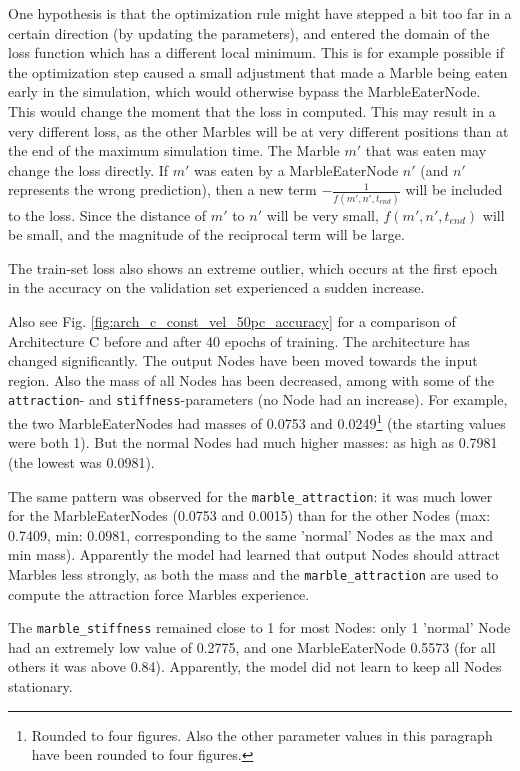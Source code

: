 One hypothesis is that the optimization rule might have stepped a bit too far in a certain direction (by updating the parameters), 
and entered the domain of the loss function which has a different local minimum. 
This is for example possible if the optimization step caused a small adjustment that made a Marble being eaten early in the simulation, 
which would otherwise bypass the MarbleEaterNode. This would change the moment that the loss in computed. 
This may result in a very different loss, as the other Marbles will be at very different positions than at the end of the maximum simulation time.
The Marble $m'$ that was eaten may change the loss directly. 
If $m'$ was eaten by a MarbleEaterNode $n'$ (and $n'$ represents the wrong prediction), 
then a new term $- \frac{1}{f(m', n', t_{end})}$ will be included to the loss. 
Since the distance of $m'$ to $n'$ will be very small, $f(m', n', t_{end})$ will be small,
and the magnitude of the reciprocal term will be large.

The train-set loss also shows an extreme outlier, which occurs at the first epoch in the accuracy on the validation set experienced a sudden increase. 

Also see Fig. \ref{fig:arch_c_const_vel_50pc_accuracy} for a comparison of Architecture C before and after 40 epochs of training. The architecture has changed significantly. The output Nodes have been moved towards the input region. Also the mass of all Nodes has been decreased, among with some of the \texttt{attraction}- and \texttt{stiffness}-parameters (no Node had an increase). For example, the two MarbleEaterNodes had masses of 0.0753 and 0.0249\footnote{Rounded to four figures. Also the other parameter values in this paragraph have been rounded to four figures.} (the starting values were both 1). But the normal Nodes had much higher masses: as high as 0.7981 (the lowest was 0.0981).

The same pattern was observed for the \texttt{marble\_attraction}: 
it was much lower for the MarbleEaterNodes (0.0753 and 0.0015) 
than for the other Nodes 
(max: 0.7409, min: 0.0981, corresponding to the same 'normal' Nodes as the max and min mass).
Apparently the model had learned that output Nodes should attract Marbles less strongly, 
as both the mass and the \texttt{marble\_attraction} are used to compute the attraction force Marbles experience.

The \texttt{marble\_stiffness} remained close to 1 for most Nodes: 
only 1 'normal' Node had an extremely low value of 0.2775, 
and one MarbleEaterNode 0.5573 (for all others it was above 0.84). 
Apparently, the model did not learn to keep all Nodes stationary. 

